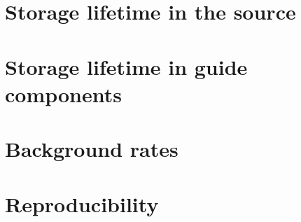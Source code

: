 \documentclass[10pt,letterpaper]{article}
\begin{document}
\section{Storage lifetime in the source}




\section{Storage lifetime in guide components}




\section{Background rates}
\label{sec:background}



\section{Reproducibility}
\end{document}
